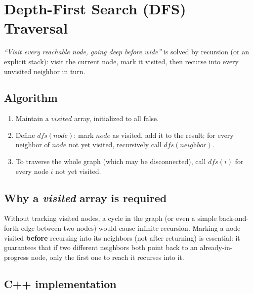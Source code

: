 \section{Depth-First Search (DFS) Traversal}
\label{sec:graph-dfs}


\begin{patternbox}
\emph{``Visit every reachable node, going deep before wide''} is solved
by recursion (or an explicit stack): visit the current node, mark it
visited, then recurse into every unvisited neighbor in turn.
\end{patternbox}

\subsection*{Algorithm}

\begin{enumerate}
  \item Maintain a $\textit{visited}$ array, initialized to all false.
  \item Define $\textit{dfs}(\textit{node})$: mark $\textit{node}$ as
        visited, add it to the result; for every neighbor of
        $\textit{node}$ not yet visited, recursively call
        $\textit{dfs}(\textit{neighbor})$.
  \item To traverse the whole graph (which may be disconnected), call
        $\textit{dfs}(i)$ for every node $i$ not yet visited.
\end{enumerate}

\subsection*{Why a \textit{visited} array is required}

Without tracking visited nodes, a cycle in the graph (or even a simple
back-and-forth edge between two nodes) would cause infinite recursion.
Marking a node visited \textbf{before} recursing into its neighbors
(not after returning) is essential: it guarantees that if two different
neighbors both point back to an already-in-progress node, only the
first one to reach it recurses into it.

\subsection*{C++ implementation}

